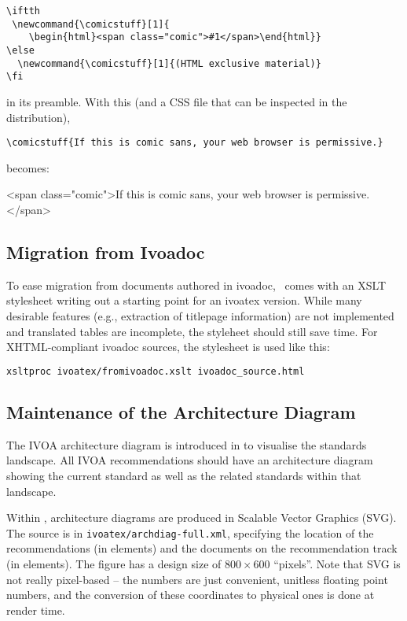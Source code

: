 \documentclass[11pt,a4paper]{ivoa}
\newcommand{\comicstuff}[1]{
    \begin{html}<span class="comic">#1</span>\end{html}}
\newcommand{\comicstuff}[1]{(HTML exclusive material)}
\begin{document}
\begin{lstlisting}
\iftth
 \newcommand{\comicstuff}[1]{
    \begin{html}<span class="comic">#1</span>\end{html}}
\else
  \newcommand{\comicstuff}[1]{(HTML exclusive material)}
\fi
\end{lstlisting}

\noindent in its preamble.  With this (and a CSS file that can be inspected in the
distribution),

\begin{lstlisting}
\comicstuff{If this is comic sans, your web browser is permissive.}
\end{lstlisting}

\noindent becomes: 
\comicstuff{If this is comic sans, your web browser is permissive.}

\subsection{Migration from Ivoadoc}

To ease migration from documents authored in ivoadoc, \ivoatex\ comes
with an XSLT stylesheet writing out a starting point for an ivoatex
version.  While many desirable features (e.g., extraction of titlepage
information) are not implemented and translated tables are incomplete,
the styleheet should still save time.  For XHTML-compliant ivoadoc
sources, the stylesheet is used like this:

\begin{lstlisting}[language=sh]
xsltproc ivoatex/fromivoadoc.xslt ivoadoc_source.html
\end{lstlisting}

\subsection{Maintenance of the Architecture Diagram}

The IVOA architecture diagram is introduced in \citet{note:VOARCH} to
visualise the standards landscape.  All IVOA recommendations should have
an architecture diagram showing the current standard as well as the
related standards within that landscape.

Within \ivoatex, architecture diagrams are produced in Scalable Vector
Graphics (SVG).  The source is in \texttt{ivoatex/archdiag-full.xml},
specifying the location of the recommendations (in  elements)
and the documents on the recommendation track (in 
elements).  The figure has a design size of $800\times 600$ ``pixels''.
Note that SVG is not really pixel-based -- the numbers are just
convenient, unitless floating point numbers, and the conversion of these
coordinates to physical ones is done at render time.
\end{document}
